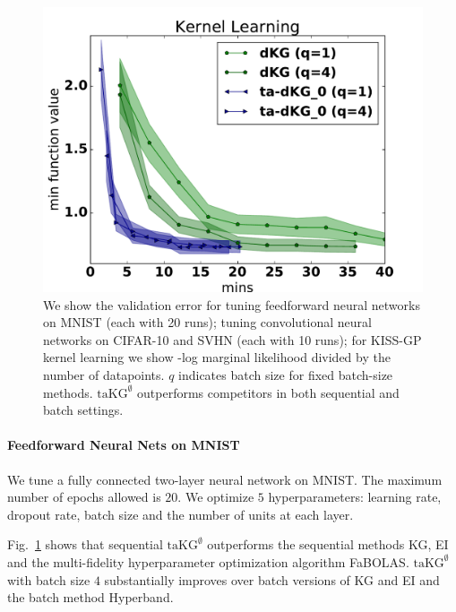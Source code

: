 \documentclass[letterpaper]{article}
\newcommand{\taKGE}{\text{taKG}^\emptyset}
\numberwithin{equation}{section}
\begin{document}
\begin{figure}[tb]
  \subfigure
  \centering
  \includegraphics[width=\figwidth, height = \figheight]{fig/KISSGP.pdf}
\vspace{-8pt}
\caption{\small We show the validation error for tuning feedforward neural networks on MNIST (each with 20 runs); tuning convolutional neural networks on CIFAR-10 and SVHN (each with 10 runs); for KISS-GP kernel learning we show -log marginal likelihood divided by the number of datapoints.
$q$ indicates batch size for fixed batch-size methods. 
$\taKGE$ outperforms competitors in both sequential and batch settings.  }
\vspace{-12pt}
\label{Fig_deep_taKG}
\end{figure}


\paragraph{Feedforward Neural Nets on MNIST}
\label{sect:mlps}
We tune a fully connected two-layer neural network on MNIST. The maximum number of epochs allowed is $20$. We optimize $5$ hyperparameters: learning rate, dropout rate, batch size and the number of units at each layer. 

Fig.~\ref{Fig_deep_taKG} shows that sequential $\taKGE$ outperforms the sequential methods KG, EI and the multi-fidelity hyperparameter optimization algorithm FaBOLAS. $\taKGE$ with batch size $4$ substantially improves over batch versions of KG and EI and the batch method Hyperband.
\end{document}
